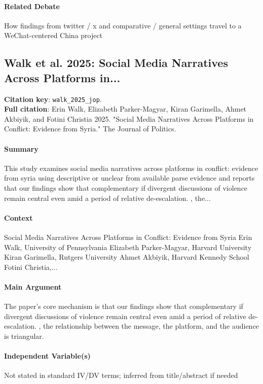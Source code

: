 \documentclass[12pt]{article}
\begin{document}
\paragraph{Related Debate} How findings from twitter / x and comparative / general settings travel to a WeChat-centered China project


\subsection{Walk et al. 2025: Social Media Narratives Across Platforms in...}
\textbf{Citation key}: \texttt{walk\_2025\_jop}.\\
\textbf{Full citation}: Erin Walk, Elizabeth Parker-Magyar, Kiran Garimella, Ahmet Akbiyik, and Fotini Christia 2025. "Social Media Narratives Across Platforms in Conflict: Evidence from Syria." The Journal of Politics.

\paragraph{Summary} This study examines social media narratives across platforms in conflict: evidence from syria using descriptive or unclear from available parse evidence and reports that our findings show that complementary if divergent discussions of violence remain central even amid a period of relative de-escalation. , the...

\paragraph{Context} Social Media Narratives Across Platforms in Conflict: Evidence from Syria Erin Walk, University of Pennsylvania Elizabeth Parker-Magyar, Harvard University Kiran Garimella, Rutgers University Ahmet Akbiyik, Harvard Kennedy School Fotini Christia,...

\paragraph{Main Argument} The paper's core mechanism is that our findings show that complementary if divergent discussions of violence remain central even amid a period of relative de-escalation. , the relationship between the message, the platform, and the audience is triangular.

\paragraph{Independent Variable(s)} Not stated in standard IV/DV terms; inferred from title/abstract if needed
\end{document}
